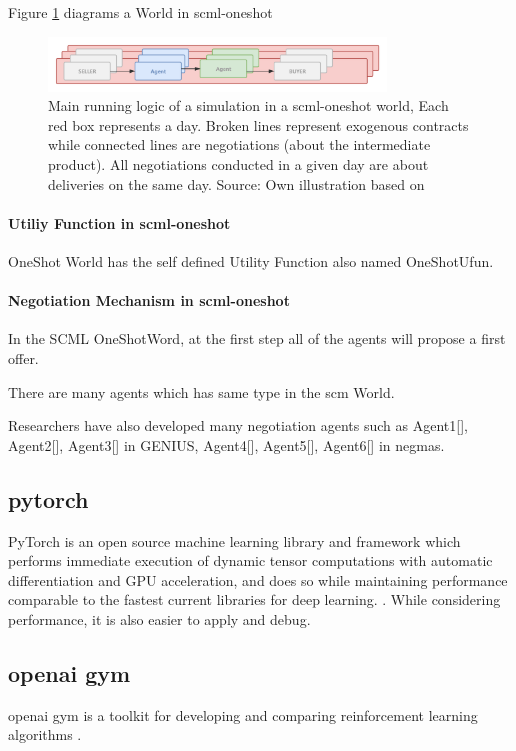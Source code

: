 Figure \ref{fig:overview-scml-oneshot} diagrams a World in \gls{scml-oneshot}

\begin{figure}[htbp]
\centering
\includegraphics[width=0.8\textwidth]{./images/overview-scml-oneshot.png}
\caption{Main running logic of a simulation in a \gls{scml-oneshot} world, Each red box represents a day. Broken lines represent exogenous contracts while connected lines are negotiations (about the intermediate product). All negotiations conducted in a given day are about deliveries on the same day. Source: Own illustration based on\parencite{Mohammad2021}}
\label{fig:overview-scml-oneshot}
\end{figure}

\paragraph{Utiliy Function in \gls{scml-oneshot}} OneShot World has the self defined Utility Function also named OneShotUfun.
\paragraph{Negotiation Mechanism in \gls{scml-oneshot}} In the SCML OneShotWord, at the first step all of the agents will propose a first offer.

There are many agents which has same type in the \gls{scm} World. 

Researchers have also developed many negotiation agents such as Agent1[], Agent2[], Agent3[] in GENIUS, Agent4[], Agent5[], Agent6[] in \gls{negmas}.

\subsection{\gls{pytorch}} PyTorch is an open source machine learning library and framework which performs immediate execution of dynamic tensor computations with automatic differentiation and GPU acceleration, and does so while maintaining performance comparable to the fastest current libraries for deep learning. \parencite{NEURIPS2019_bdbca288}. While considering performance, it is also easier to apply and debug.

\subsection{\gls{openai gym}}
\gls{openai gym} is a toolkit for developing and comparing reinforcement learning algorithms \parencite{brockman2016openai}.
